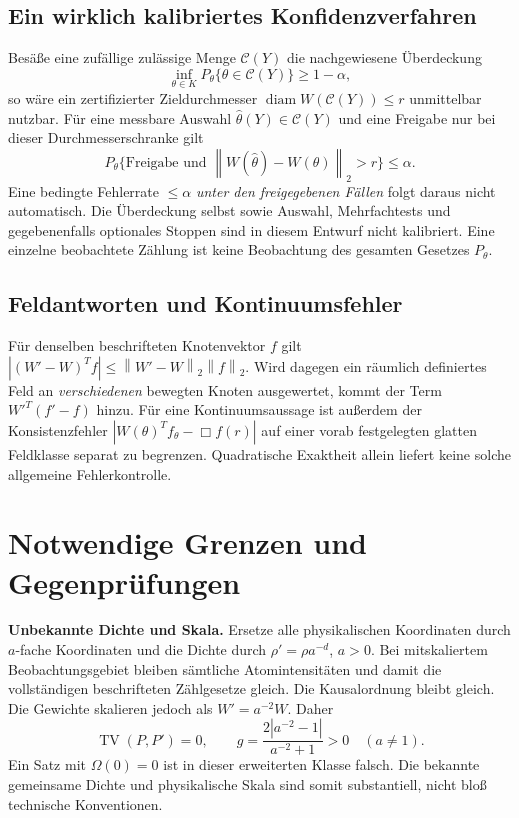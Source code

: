 \documentclass[11pt,a4paper]{article}
\theoremstyle{definition}\newtheorem{definition}{Definition}
\theoremstyle{remark}\newtheorem*{remark}{Bemerkung}
\newcommand{\TV}{\operatorname{TV}}
\newcommand{\norm}[1]{\left\lVert#1\right\rVert}
\newcommand{\diam}{\operatorname{diam}}
\begin{document}
\subsection{Ein wirklich kalibriertes Konfidenzverfahren}
Besäße eine zufällige zulässige Menge $\mathcal C(Y)$ die nachgewiesene Überdeckung
\[
 \inf_{\theta\in K}P_\theta\{\theta\in\mathcal C(Y)\}\geq1-\alpha,
\]
so wäre ein zertifizierter Zieldurchmesser $\diam W(\mathcal C(Y))\leq r$ unmittelbar nutzbar. Für eine messbare Auswahl $\widehat\theta(Y)\in\mathcal C(Y)$ und eine Freigabe nur bei dieser Durchmesserschranke gilt
\[
 P_\theta\{\text{Freigabe und }\norm{W(\widehat\theta)-W(\theta)}_2>r\}
 \leq\alpha.
\]
Eine bedingte Fehlerrate $\leq\alpha$ \emph{unter den freigegebenen Fällen} folgt daraus nicht automatisch. Die Überdeckung selbst sowie Auswahl, Mehrfachtests und gegebenenfalls optionales Stoppen sind in diesem Entwurf nicht kalibriert. Eine einzelne beobachtete Zählung ist keine Beobachtung des gesamten Gesetzes $P_\theta$.

\subsection{Feldantworten und Kontinuumsfehler}
Für denselben beschrifteten Knotenvektor $f$ gilt
$|(W'-W)^Tf|\leq\norm{W'-W}_2\norm f_2$.
Wird dagegen ein räumlich definiertes Feld an \emph{verschiedenen} bewegten Knoten ausgewertet, kommt der Term $W'^T(f'-f)$ hinzu. Für eine Kontinuumsaussage ist außerdem der Konsistenzfehler
$|W(\theta)^Tf_\theta-\Box f(r)|$ auf einer vorab festgelegten glatten Feldklasse separat zu begrenzen. Quadratische Exaktheit allein liefert keine solche allgemeine Fehlerkontrolle.

\section{Notwendige Grenzen und Gegenprüfungen}

\textbf{Unbekannte Dichte und Skala.} Ersetze alle physikalischen Koordinaten durch $a$-fache Koordinaten und die Dichte durch $\rho'=\rho a^{-d}$, $a>0$. Bei mitskaliertem Beobachtungsgebiet bleiben sämtliche Atomintensitäten und damit die vollständigen beschrifteten Zählgesetze gleich. Die Kausalordnung bleibt gleich. Die Gewichte skalieren jedoch als $W'=a^{-2}W$. Daher
\[
 \TV(P,P')=0,\qquad
 g=\frac{2|a^{-2}-1|}{a^{-2}+1}>0\quad(a\ne1).
\]
Ein Satz mit $\Omega(0)=0$ ist in dieser erweiterten Klasse falsch. Die bekannte gemeinsame Dichte und physikalische Skala sind somit substantiell, nicht bloß technische Konventionen.
\end{document}
